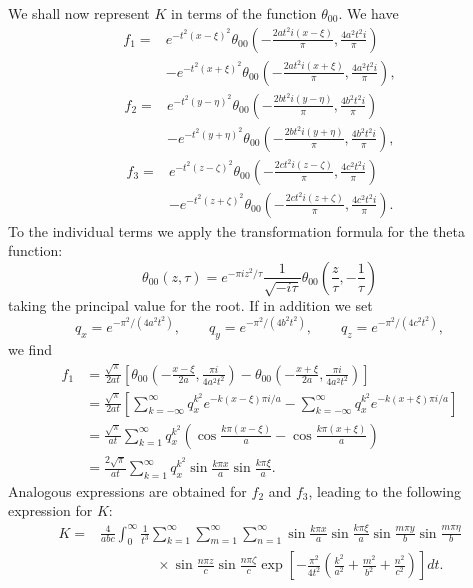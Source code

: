 We shall now represent $K$ in terms of the function $\theta_{00}$. We have
\[
\begin{aligned}
f_1={}&e^{-t^2(x-\xi)^2}\theta_{00}\left(-\frac{2at^2i(x-\xi)}{\pi},\frac{4a^2t^2i}{\pi}\right)\\
&-e^{-t^2(x+\xi)^2}\theta_{00}\left(-\frac{2at^2i(x+\xi)}{\pi},\frac{4a^2t^2i}{\pi}\right),
\end{aligned}
\]
\[
\begin{aligned}
f_2={}&e^{-t^2(y-\eta)^2}\theta_{00}\left(-\frac{2bt^2i(y-\eta)}{\pi},\frac{4b^2t^2i}{\pi}\right)\\
&-e^{-t^2(y+\eta)^2}\theta_{00}\left(-\frac{2bt^2i(y+\eta)}{\pi},\frac{4b^2t^2i}{\pi}\right),
\end{aligned}
\]
\[
\begin{aligned}
f_3={}&e^{-t^2(z-\zeta)^2}\theta_{00}\left(-\frac{2ct^2i(z-\zeta)}{\pi},\frac{4c^2t^2i}{\pi}\right)\\
&-e^{-t^2(z+\zeta)^2}\theta_{00}\left(-\frac{2ct^2i(z+\zeta)}{\pi},\frac{4c^2t^2i}{\pi}\right).
\end{aligned}
\]
To the individual terms we apply the transformation formula for the theta function:
\[
\theta_{00}(z,\tau)=e^{-\pi iz^2/\tau}\frac1{\sqrt{-i\tau}}\theta_{00}\left(\frac z\tau,-\frac1\tau\right)
\]
taking the principal value for the root. If in addition we set
\[
q_x=e^{-\pi^2/(4a^2t^2)},\qquad q_y=e^{-\pi^2/(4b^2t^2)},\qquad q_z=e^{-\pi^2/(4c^2t^2)},
\]
we find
\begin{equation}\tag{111}
\begin{aligned}
f_1
&=\frac{\sqrt\pi}{2at}\left[\theta_{00}\left(-\frac{x-\xi}{2a},\frac{\pi i}{4a^2t^2}\right)-\theta_{00}\left(-\frac{x+\xi}{2a},\frac{\pi i}{4a^2t^2}\right)\right]\\
&=\frac{\sqrt\pi}{2at}\left[\sum_{k=-\infty}^{\infty}q_x^{k^2}e^{-k(x-\xi)\pi i/a}-\sum_{k=-\infty}^{\infty}q_x^{k^2}e^{-k(x+\xi)\pi i/a}\right]\\
&=\frac{\sqrt\pi}{at}\sum_{k=1}^{\infty}q_x^{k^2}\left(\cos\frac{k\pi(x-\xi)}a-\cos\frac{k\pi(x+\xi)}a\right)\\
&=\frac{2\sqrt\pi}{at}\sum_{k=1}^{\infty}q_x^{k^2}\sin\frac{k\pi x}{a}\sin\frac{k\pi\xi}{a}.
\end{aligned}
\end{equation}
Analogous expressions are obtained for $f_2$ and $f_3$, leading to the following expression for $K$:
\[
\begin{aligned}
K={}&\frac4{abc}\int_0^{\infty}\frac1{t^3}\sum_{k=1}^{\infty}\sum_{m=1}^{\infty}\sum_{n=1}^{\infty}
\sin\frac{k\pi x}{a}\sin\frac{k\pi\xi}{a}
\sin\frac{m\pi y}{b}\sin\frac{m\pi\eta}{b}\\
&\qquad\qquad\times\sin\frac{n\pi z}{c}\sin\frac{n\pi\zeta}{c}
\exp\left[-\frac{\pi^2}{4t^2}\left(\frac{k^2}{a^2}+\frac{m^2}{b^2}+\frac{n^2}{c^2}\right)\right]dt.
\end{aligned}
\]
